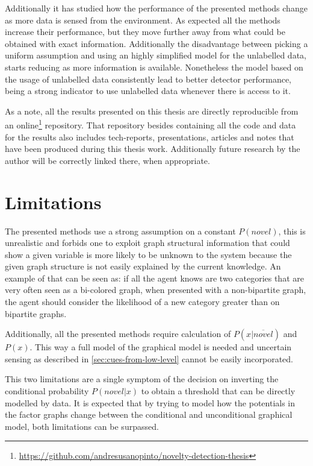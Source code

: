 Additionally it has studied how the performance of the presented methods change as more data
is sensed from the environment. As expected all the methods increase their performance, but they
move further away from what could be obtained with exact information.
Additionally the disadvantage between picking a uniform assumption and using an highly simplified
model for the unlabelled data, starts reducing as more information is available.
Nonetheless the model based on the usage of unlabelled data consistently lead to better detector
performance, being a strong indicator to use unlabelled data whenever there is access to it.

As a note, all the results presented on this thesis are directly reproducible from an
online\footnote{\url{https://github.com/andresusanopinto/novelty-detection-thesis}}
repository. That repository besides containing all the code and data for the results also
includes tech-reports, presentations, articles and notes that have been produced during
this thesis work. Additionally future research by the author will be correctly linked there,
when appropriate.

\section{Limitations}

The presented methods use a strong assumption on a constant $P(novel)$, this is unrealistic and
forbids one to exploit graph structural information that could show a given variable is more likely
to be unknown to the system because the given graph structure is not easily explained by the
current knowledge.
An example of that can be seen as: if all the agent knows are two categories that are very often
seen as a bi-colored graph, when presented with a non-bipartite graph, the agent should consider
the likelihood of a new category greater than on bipartite graphs.

Additionally, all the presented methods require calculation of $P(x|\overline{novel})$ and
$P(x)$. This way a full model of the graphical model is needed and uncertain sensing as described in
\autoref{sec:cues-from-low-level} cannot be easily incorporated.

This two limitations are a single symptom of the decision on inverting the conditional probability
$P(novel|x)$ to obtain a threshold that can be directly modelled by data.
It is expected that by trying to model how the potentials in the factor graphs change between the
conditional and unconditional graphical model, both limitations can be surpassed.


